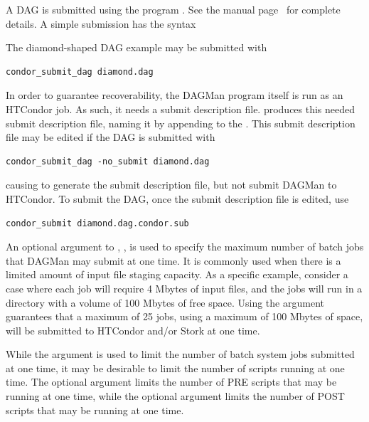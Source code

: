 A DAG is submitted using the program .
See the manual
page~\pageref{man-condor-submit-dag}
for complete details.
A simple submission has the syntax

 

The diamond-shaped DAG example may be submitted with

\begin{verbatim}
condor_submit_dag diamond.dag
\end{verbatim}
In order to guarantee recoverability, the DAGMan program itself
is run as an HTCondor job.
As such, it needs a submit description file.
 produces this needed submit description file,
naming it by appending  to the .
This submit description file may be edited if the DAG is
submitted with

\begin{verbatim}
condor_submit_dag -no_submit diamond.dag
\end{verbatim}
causing  to generate the submit description file,
but not submit DAGMan to HTCondor.
To submit the DAG, once the submit description file is edited,
use

\begin{verbatim}
condor_submit diamond.dag.condor.sub
\end{verbatim}

An optional argument to , , 
is used to specify the maximum number of batch jobs that DAGMan may
submit at one time.
It is commonly used when 
there is a limited amount of input file staging capacity.
As a specific example, consider a case where each job will
require 4 Mbytes of input files,
and the jobs will run in a directory with a volume of 100 Mbytes
of free space.
Using the argument  guarantees that a maximum
of 25 jobs, using a maximum of 100 Mbytes of space,
will be submitted to HTCondor and/or Stork at one time.

While the  argument is used to limit the number
of batch system jobs submitted at one time,
it may be desirable to limit the number of scripts running
at one time.
The optional  argument limits the number of PRE
scripts that may be running at one time,
while the optional  argument limits the number of POST
scripts that may be running at one time.

